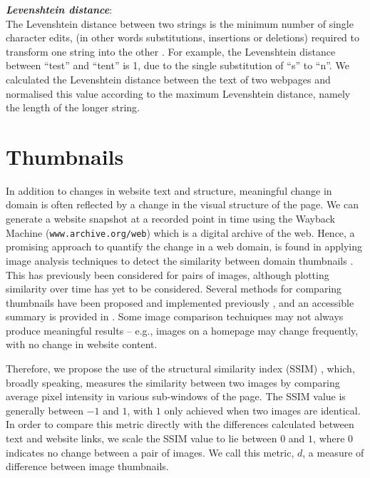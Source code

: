 \documentclass[10pt, a4paper]{article}
\begin{document}
\vspace{1.5mm}
\noindent \textit{\textbf{Levenshtein distance}}:\\
The Levenshtein distance between two strings is the minimum number of single character edits, (in other words substitutions, insertions or deletions) required to transform one string into the other \cite{levenshtein1996}. For example, the Levenshtein distance between ``test'' and ``tent'' is 1, due to the single substitution of ``s'' to ``n''.
We calculated the Levenshtein distance between the text of two webpages and normalised this value according to the maximum Levenshtein distance, namely the length of the longer string. 
\vspace{-3mm}

\section{Thumbnails}
\vspace{-2mm}
In addition to changes in website text and structure, meaningful change in domain is often reflected by a change in the visual structure of the page. We can generate a website snapshot at a recorded point in time using the Wayback Machine (\texttt{www.archive.org/web}) which is a digital archive of the web. Hence, a promising approach to quantify the change in a web domain, is found in applying image analysis techniques to detect the similarity between domain thumbnails \cite{alsum2014thumbnail}. This has previously been considered for pairs of images, although plotting similarity over time has yet to be considered. Several methods for comparing thumbnails have been proposed and implemented previously \cite{henzinger,broder,manku}, and an accessible summary is provided in \cite{alsum2014thumbnail}. Some image comparison techniques may not always produce meaningful results -- e.g., images on a homepage may change frequently, with no change in website content.

Therefore, we propose the use of the structural similarity index (SSIM) \cite{ssim}, which, broadly speaking, measures the similarity between two images by comparing average pixel intensity in various sub-windows of the page. The SSIM value is generally between $-1$ and $1$, with $1$ only achieved when two images are identical. In order to compare this metric directly with the differences calculated between text and website links, we scale the SSIM value to lie between $0$ and $1$, where $0$ indicates no change between a pair of images. We call this metric, $d$, a measure of difference between image thumbnails.
\end{document}
